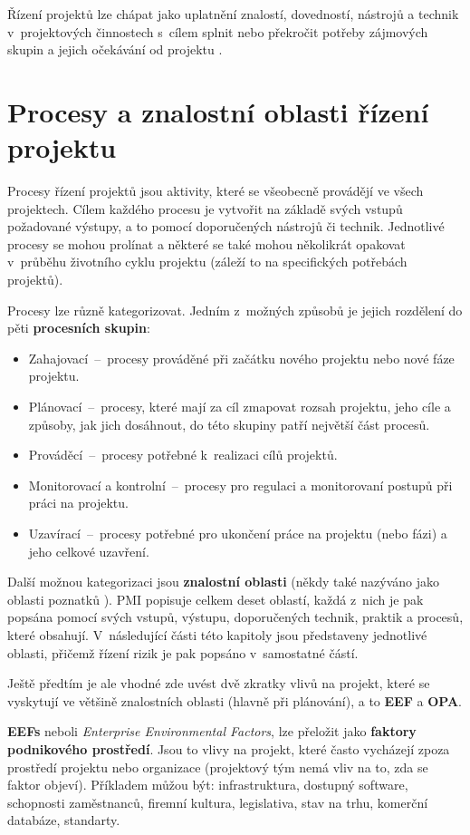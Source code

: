 Řízení projektů lze chápat jako uplatnění znalostí, dovedností, nástrojů a technik v~projektových činnostech s~cílem splnit nebo překročit potřeby zájmových skupin a jejich očekávání od projektu \cite{ZaklPojmy}.

\section{Procesy a znalostní oblasti řízení projektu}

Procesy řízení projektů jsou aktivity, které se všeobecně provádějí ve všech projektech. Cílem každého procesu je vytvořit na základě svých vstupů požadované výstupy, a to pomocí doporučených nástrojů či technik. Jednotlivé procesy se mohou prolínat a některé se také mohou několikrát opakovat v~průběhu životního cyklu projektu (záleží to na specifických potřebách projektů).

Procesy lze různě kategorizovat. Jedním z~možných způsobů je jejich rozdělení do pěti \textbf{procesních skupin}:
\begin{itemize}
    \item Zahajovací \,--\, procesy prováděné při začátku nového projektu nebo nové fáze projektu.
    \item Plánovací \,--\, procesy, které mají za cíl zmapovat rozsah projektu, jeho cíle a způsoby, jak jich dosáhnout, do této skupiny patří největší část procesů.
    \item Prováděcí \,--\, procesy potřebné k~realizaci cílů projektů.
    \item Monitorovací a kontrolní \,--\, procesy pro regulaci a monitorovaní postupů při práci na projektu.
    \item Uzavírací \,--\, procesy potřebné pro ukončení práce na projektu (nebo fázi) a jeho celkové uzavření.
\end{itemize}
Další možnou kategorizaci jsou \textbf{znalostní oblasti} (někdy také nazýváno jako oblasti poznatků \cite{StrategieRizeni}). PMI popisuje celkem deset oblastí, každá z~nich je pak popsána pomocí svých vstupů, výstupu, doporučených technik, praktik a procesů, které obsahují. V~následující části této kapitoly jsou představeny jednotlivé oblasti, přičemž řízení rizik je pak popsáno v~samostatné částí. 

Ještě předtím je ale vhodné zde uvést dvě zkratky vlivů na projekt, které se vyskytují ve většině znalostních oblasti (hlavně při plánování), a to \textbf{EEF} a \textbf{OPA}.

\textbf{EEFs} neboli \textit{Enterprise Environmental Factors}, lze přeložit jako \textbf{faktory podnikového prostředí}. Jsou to vlivy na projekt, které často vycházejí zpoza prostředí projektu nebo organizace (projektový tým nemá vliv na to, zda se faktor objeví). Příkladem můžou být: infrastruktura, dostupný software, schopnosti zaměstnanců, firemní kultura, legislativa, stav na trhu, komerční databáze, standarty.


